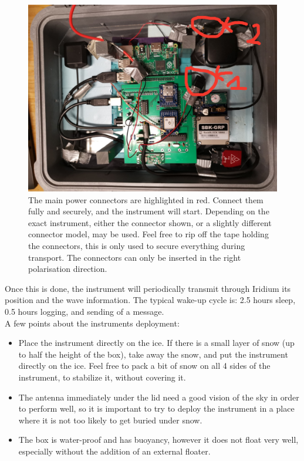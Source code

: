 \documentclass[pdftex,a4paper,12pt,twocolumn,fleqn,captions=tableheading]{scrartcl}
\begin{document}
  \begin{figure}
  \begin{center}
  \includegraphics[width=.8\textwidth]{Figures/connectors}
  \caption{\label{Connector} The main power connectors are highlighted in red. Connect them fully and securely, and the instrument will start. Depending on the exact instrument, either the connector shown, or a slightly different connector model, may be used. Feel free to rip off the tape holding the connectors, this is only used to secure everything during transport. The connectors can only be inserted in the right polarisation direction.}
  \end{center}
  \end{figure}

Once this is done, the instrument will periodically transmit through Iridium its position and the wave information. The typical wake-up cycle is: 2.5 hours sleep, 0.5 hours logging, and sending of a message. ~\\

A few points about the instruments deployment:

\begin{itemize}
  \item Place the instrument directly on the ice. If there is a small layer of snow (up to half the height of the box), take away the snow, and put the instrument directly on the ice. Feel free to pack a bit of snow on all 4 sides of the instrument, to stabilize it, without covering it.
  \item The antenna immediately under the lid need a good vision of the sky in order to perform well, so it is important to try to deploy the instrument in a place where it is not too likely to get buried under snow.
  \item The box is water-proof and has buoyancy, however it does not float very well, especially without the addition of an external floater.
\end{itemize}
\end{document}
